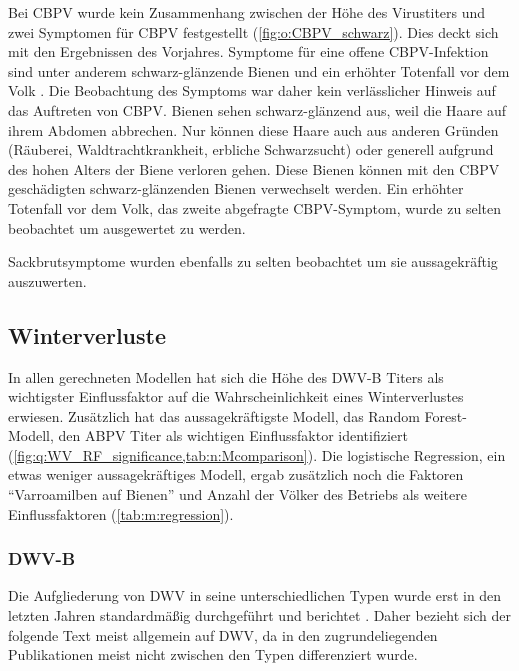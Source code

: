 Bei CBPV wurde kein Zusammenhang zwischen der Höhe des Virustiters und zwei Symptomen für CBPV festgestellt (\cref{fig:o:CBPV_schwarz}). Dies deckt sich mit den Ergebnissen des Vorjahres. Symptome für eine offene CBPV-Infektion sind unter anderem schwarz-glänzende Bienen und ein erhöhter Totenfall vor dem Volk \citep{ribiere2010}. Die Beobachtung des Symptoms war daher kein verlässlicher Hinweis auf das Auftreten von CBPV. Bienen sehen schwarz-glänzend aus, weil die Haare auf ihrem Abdomen abbrechen. Nur können diese Haare auch aus anderen Gründen (Räuberei, Waldtrachtkrankheit, erbliche Schwarzsucht) oder generell aufgrund des hohen Alters der Biene verloren gehen. Diese Bienen können mit den CBPV geschädigten schwarz-glänzenden Bienen verwechselt werden. Ein erhöhter Totenfall vor dem Volk, das zweite abgefragte CBPV-Symptom, wurde zu selten beobachtet um ausgewertet zu werden.

Sackbrutsymptome wurden ebenfalls zu selten beobachtet um sie aussagekräftig auszuwerten.

\subsection{Winterverluste}

In allen gerechneten Modellen hat sich die Höhe des DWV-B Titers als wichtigster Einflussfaktor auf die Wahrscheinlichkeit eines Winterverlustes erwiesen. Zusätzlich hat das aussagekräftigste Modell, das Random Forest-Modell, den ABPV Titer als wichtigen Einflussfaktor identifiziert (\cref{fig:q:WV_RF_significance,tab:n:Mcomparison}). Die logistische Regression, ein etwas weniger aussagekräftiges Modell, ergab zusätzlich noch die Faktoren \enquote{Varroamilben auf Bienen} und Anzahl der Völker des Betriebs als weitere Einflussfaktoren (\cref{tab:m:regression}).

\subsubsection{DWV-B}

Die Aufgliederung von DWV in seine unterschiedlichen Typen wurde erst in den letzten Jahren standardmäßig durchgeführt und berichtet \citep{martin2012,mordecai2016}. Daher bezieht sich der folgende Text meist allgemein auf DWV, da in den zugrundeliegenden Publikationen meist nicht zwischen den Typen differenziert wurde.

